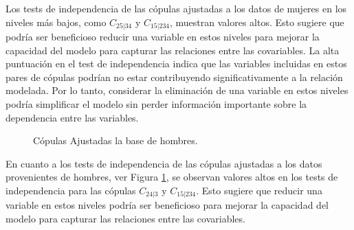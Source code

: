 Los tests de independencia de las cópulas ajustadas a los datos de mujeres en los niveles más bajos, como $C_{25|34}$ y $C_{15|234}$, muestran valores altos. Esto sugiere que podría ser beneficioso reducir una variable en estos niveles para mejorar la capacidad del modelo para capturar las relaciones entre las covariables. La alta puntuación en el test de independencia indica que las variables incluidas en estos pares de cópulas podrían no estar contribuyendo significativamente a la relación modelada. Por lo tanto, considerar la eliminación de una variable en estos niveles podría simplificar el modelo sin perder información importante sobre la dependencia entre las variables.

\begin{figure}[H]
 \centering
    \caption{Cópulas Ajustadas la base de hombres.}
    \label{fig:copulasTestHo}
\end{figure}

En cuanto a los tests de independencia de las cópulas ajustadas a los datos provenientes de hombres, ver Figura \ref{fig:copulasTestHo}, se observan valores altos en los tests de independencia para las cópulas $C_{24|3}$ y $C_{15|234}$. Esto sugiere que reducir una variable en estos niveles podría ser beneficioso para mejorar la capacidad del modelo para capturar las relaciones entre las covariables. 

